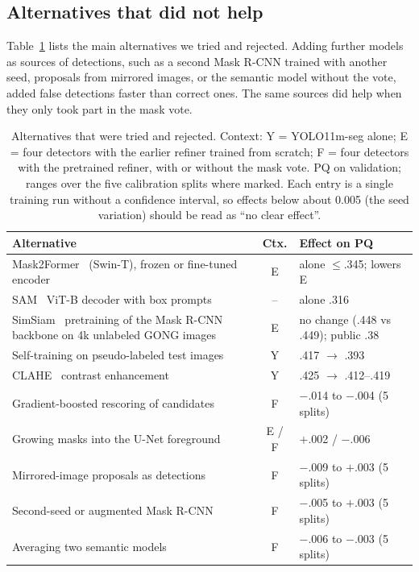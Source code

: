 \documentclass[conference]{IEEEtran}
\begin{document}
\subsection{Alternatives that did not help}
Table~\ref{tab:neg} lists the main alternatives we tried and rejected. Adding further models as sources of detections, such as a second Mask R-CNN trained with another seed, proposals from mirrored images, or the semantic model without the vote, added false detections faster than correct ones. The same sources did help when they only took part in the mask vote.
\begin{table}[t]
\centering
\caption{Alternatives that were tried and rejected. Context: Y = YOLO11m-seg alone; E = four detectors with the earlier refiner trained from scratch; F = four detectors with the pretrained refiner, with or without the mask vote. PQ on validation; ranges over the five calibration splits where marked. Each entry is a single training run without a confidence interval, so effects below about 0.005 (the seed variation) should be read as ``no clear effect''.}
\label{tab:neg}
\setlength{\tabcolsep}{2.6pt}
\begin{tabular}{>{\raggedright\arraybackslash}p{4.25cm}c>{\raggedright\arraybackslash}p{2.85cm}}
\toprule
Alternative & Ctx. & Effect on PQ \\
\midrule
Mask2Former~\cite{cheng2022mask2former} (Swin-T), frozen or fine-tuned encoder & E & alone $\le$.345; lowers E \\
SAM~\cite{kirillov2023sam} ViT-B decoder with box prompts & -- & alone .316 \\
SimSiam~\cite{chen2021simsiam} pretraining of the Mask R-CNN backbone on 4k unlabeled GONG images & E & no change (.448 vs .449); public .38 \\
Self-training on pseudo-labeled test images & Y & .417 $\rightarrow$ .393 \\
CLAHE~\cite{zuiderveld1994clahe} contrast enhancement & Y & .425 $\rightarrow$ .412--.419 \\
Gradient-boosted rescoring of candidates & F & $-$.014 to $-$.004 (5 splits) \\
Growing masks into the U-Net foreground & E / F & $+$.002 / $-$.006 \\
Mirrored-image proposals as detections & F & $-$.009 to $+$.003 (5 splits) \\
Second-seed or augmented Mask R-CNN & F & $-$.005 to $+$.003 (5 splits) \\
Averaging two semantic models & F & $-$.006 to $-$.003 (5 splits) \\
\bottomrule
\end{tabular}
\end{table}
\end{document}
